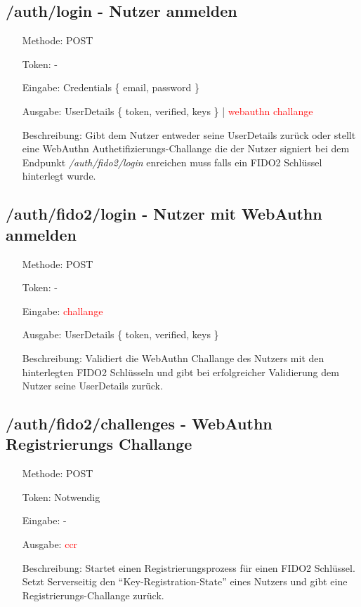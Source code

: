 \documentclass[journal]{IEEEtran}
\begin{document}
\subsection{/auth/login - Nutzer anmelden}

\begin{itemize}
	\setlength{\leftskip}{1.5cm}
	\setlength{\itemsep}{0pt}
	\item[Methode:] POST
	\item[Token:] -
	\item[Eingabe:] Credentials \{ email, password \}
	\item[Ausgabe:] UserDetails \{ token, verified, keys \} | \textcolor{red}{webauthn challange}
	\item[Beschreibung:] Gibt dem Nutzer entweder seine UserDetails zurück oder
		stellt eine WebAuthn Authetifizierungs-Challange die der Nutzer
		signiert bei dem Endpunkt \textit{/auth/fido2/login} enreichen muss
		falls ein FIDO2 Schlüssel hinterlegt wurde.
\end{itemize}

\subsection{/auth/fido2/login - Nutzer mit WebAuthn anmelden}

\begin{itemize}
	\setlength{\leftskip}{1.5cm}
	\setlength{\itemsep}{0pt}
	\item[Methode:] POST
	\item[Token:] -
	\item[Eingabe:] \textcolor{red}{challange}
	\item[Ausgabe:] UserDetails \{ token, verified, keys \}
	\item[Beschreibung:] Validiert die WebAuthn Challange des Nutzers mit den
		hinterlegten FIDO2 Schlüsseln und gibt bei erfolgreicher Validierung
		dem Nutzer seine UserDetails zurück.
\end{itemize}

\subsection{/auth/fido2/challenges - WebAuthn Registrierungs Challange}

\begin{itemize}
	\setlength{\leftskip}{1.5cm}
	\setlength{\itemsep}{0pt}
	\item[Methode:] POST
	\item[Token:] Notwendig
	\item[Eingabe:] -
	\item[Ausgabe:] \textcolor{red}{ccr}
	\item[Beschreibung:] Startet einen Registrierungsprozess für einen FIDO2
		Schlüssel. Setzt Serverseitig den ``Key-Registration-State'' eines
		Nutzers und gibt eine Registrierungs-Challange zurück.
\end{itemize}
\end{document}

